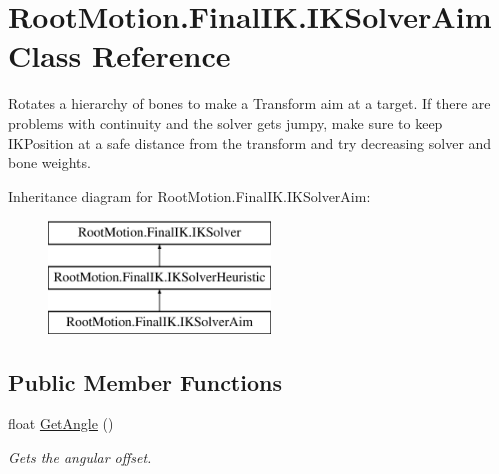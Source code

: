 \hypertarget{class_root_motion_1_1_final_i_k_1_1_i_k_solver_aim}{}\section{Root\+Motion.\+Final\+I\+K.\+I\+K\+Solver\+Aim Class Reference}
\label{class_root_motion_1_1_final_i_k_1_1_i_k_solver_aim}


Rotates a hierarchy of bones to make a Transform aim at a target. If there are problems with continuity and the solver get\textquotesingle{}s jumpy, make sure to keep I\+K\+Position at a safe distance from the transform and try decreasing solver and bone weights.  


Inheritance diagram for Root\+Motion.\+Final\+I\+K.\+I\+K\+Solver\+Aim\+:\begin{figure}[H]
\begin{center}
\leavevmode
\includegraphics[height=3.000000cm]{class_root_motion_1_1_final_i_k_1_1_i_k_solver_aim}
\end{center}
\end{figure}
\subsection*{Public Member Functions}
\begin{DoxyCompactItemize}
\item 
float \mbox{\hyperlink{class_root_motion_1_1_final_i_k_1_1_i_k_solver_aim_a2c2dd7833dfbe068e128b4f43d60a518}{Get\+Angle}} ()
\begin{DoxyCompactList}\small\item\em Gets the angular offset. \end{DoxyCompactList}\end{DoxyCompactItemize}
